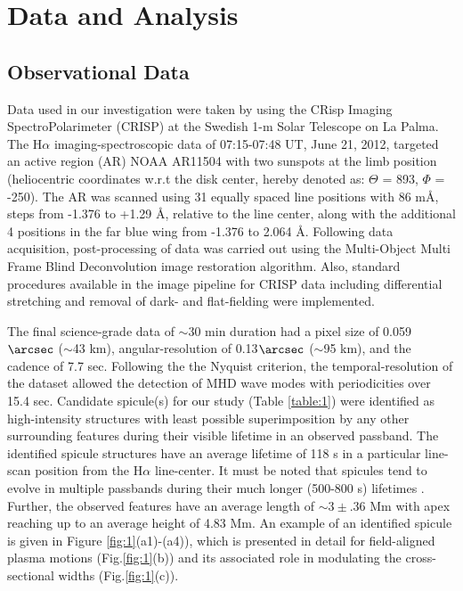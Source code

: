 \section{Data and Analysis}

\subsection{Observational Data}

Data used in our investigation were taken by using the CRisp Imaging SpectroPolarimeter (CRISP) at the Swedish 1-m Solar Telescope \citep[SST:][]{Scharmer2008} on La Palma. The H$\alpha$ imaging-spectroscopic data of 07:15-07:48 UT, June 21, 2012, targeted an active region (AR) NOAA AR11504 with two sunspots at the limb position (heliocentric coordinates w.r.t the disk center, hereby denoted as: $\Theta$ = 893, $\Phi$ = -250). The AR was scanned using 31 equally spaced line positions with 86 m\AA, steps from -1.376 to +1.29 \AA, relative to the line center, along with the additional 4 positions in the far blue wing from -1.376 to 2.064 \AA. Following data acquisition, post-processing of data was carried out using the Multi-Object Multi Frame Blind Deconvolution \citep [MOMFBD;][]{2005} image restoration algorithm. Also, standard procedures available in the image pipeline for CRISP data \citep{2015} including differential stretching and removal of dark- and flat-fielding were implemented. 

The final science-grade data of $\sim$30 min duration had a pixel size of 0.059$\arcsec$ ($\sim$43 km), angular-resolution of 0.13$\arcsec$ ($\sim$95 km), and the cadence of 7.7 sec. Following the the Nyquist criterion, the temporal-resolution of the dataset allowed the detection of MHD wave modes with periodicities over 15.4 sec. Candidate spicule(s) for our study (Table \ref{table:1}) were identified as high-intensity structures with least possible superimposition by any other surrounding features during their visible lifetime in an observed passband. The identified spicule structures have an average lifetime of 118 s in a particular line-scan position from the H$\alpha$ line-center. It must be noted that spicules tend to evolve in multiple passbands during their much longer (500-800 s) lifetimes \citep{Pereira2014}. Further, the observed features have an average length of $\sim3\pm$.36 Mm with apex reaching up to an average height of 4.83 Mm. An example of an identified spicule is given in Figure \ref{fig:1}(a1)-(a4)), which is presented in detail for field-aligned plasma motions (Fig.\ref{fig:1}(b)) and its associated role in modulating the cross-sectional widths (Fig.\ref{fig:1}(c)). \\

